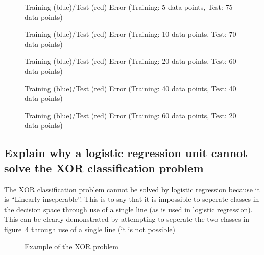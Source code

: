 \documentclass[titlepage]{scrartcl}
\begin{document}
\begin{figure}
    \caption{Training (blue)/Test (red) Error (Training: 5 data points, Test:
    75 data points)}
    \label{costTestTrain5}
    \caption{Training (blue)/Test (red) Error (Training: 10 data points, Test:
    70 data points)}
    \label{costTestTrain10}
\end{figure}
\begin{figure}
    \caption{Training (blue)/Test (red) Error (Training: 20 data points, Test:
    60 data points)}
    \label{costTestTrain20}
    \caption{Training (blue)/Test (red) Error (Training: 40 data points, Test:
    40 data points)}
    \label{costTestTrain40}
\end{figure}
\begin{figure}
    \caption{Training (blue)/Test (red) Error (Training: 60 data points, Test:
    20 data points)}
    \label{costTestTrain60}
\end{figure}

\subsection{Explain why a logistic regression unit cannot solve the XOR
classification problem}
The XOR classification problem cannot be solved by logistic regression because
it is ``Linearly inseperable''. This is to say that it is impossible to
seperate classes in the decision space through use of a single line (as is used
in logistic regression). This can be clearly demonstrated by attempting to
seperate the two classes in figure~\ref{XOR} through use of a single line (it is not
possible)

\begin{figure}
    \caption{Example of the XOR problem}
    \label{XOR}
\end{figure}


\end{document}
